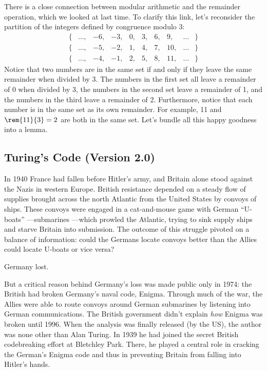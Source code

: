 There is a close connection between modular arithmetic and the
remainder operation, which we looked at last time.  To clarify this
link, let's reconsider the partition of the integers defined by
congruence modulo 3:
%
\[
\begin{array}{cccccccccc}
\{ & \dots, & -6, & -3, & 0, & 3, & 6, & 9, & \dots & \} \\
\{ & \dots, & -5, & -2, & 1, & 4, & 7, & 10, & \dots & \} \\
\{ & \dots, & -4, & -1, & 2, & 5, & 8, & 11, & \dots & \}
\end{array}
\]
%
Notice that two numbers are in the same set if and only if they leave
the same remainder when divided by 3.  The numbers in the first set
all leave a remainder of 0 when divided by 3, the numbers in the
second set leave a remainder of 1, and the numbers in the third leave
a remainder of 2.  Furthermore, notice that each number is in the same
set as its own remainder.  For example, 11 and $\rem{11}{3} = 2$ are
both in the same set.  Let's bundle all this happy goodness into a
lemma.
\fi


\subsection{Turing's Code (Version 2.0)}

In 1940 France had fallen before Hitler's army, and Britain alone stood
against the Nazis in western Europe.  British resistance depended on a
steady flow of supplies brought across the north Atlantic from the United
States by convoys of ships.  These convoys were engaged in a cat-and-mouse
game with German ``U-boats'' ---submarines ---which prowled the Atlantic,
trying to sink supply ships and starve Britain into submission.  The
outcome of this struggle pivoted on a balance of information: could the
Germans locate convoys better than the Allies could locate U-boats or vice
versa?

Germany lost.

But a critical reason behind Germany's loss was made public only in
1974: the British had broken Germany's naval code, Enigma.  Through
much of the war, the Allies were able to route convoys around German
submarines by listening into German communications.  The British
government didn't explain \textit{how} Enigma was broken until 1996.
When the analysis was finally released (by the US), the author was
none other than Alan Turing.  In 1939 he had joined the secret British
codebreaking effort at Bletchley Park.  There, he played a central
role in cracking the German's Enigma code and thus in preventing
Britain from falling into Hitler's hands.

